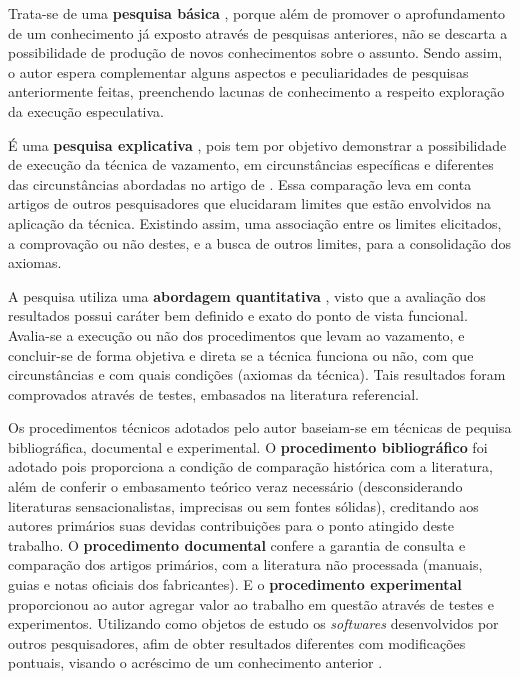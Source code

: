 \documentclass[
	article,			    %
	12pt,				    %
	oneside,			    %
	a4paper,			    %
	chapter=TITLE,		    %
	section=TITLE,		    %
	subsection=TITLE,	    %
	english,			    %
	brazil,				    %
	sumario=tradicional
]{abntex2}
\begin{document}
Trata-se de uma \textbf{pesquisa básica} \cite{Fernando1987Por}, porque além de promover o aprofundamento de um conhecimento já exposto através de pesquisas anteriores, não se descarta a possibilidade de produção de novos conhecimentos sobre o assunto. Sendo assim, o autor espera complementar alguns aspectos e peculiaridades de pesquisas anteriormente feitas, preenchendo lacunas de conhecimento a respeito exploração da execução especulativa.

É uma \textbf{pesquisa explicativa} \cite{Rampazzo2005Metodologia}, pois tem por objetivo demonstrar a possibilidade de execução da técnica de vazamento, em circunstâncias específicas e diferentes das circunstâncias abordadas no artigo de . Essa comparação leva em conta artigos de outros pesquisadores que elucidaram limites que estão envolvidos na aplicação da técnica. Existindo assim, uma associação entre os limites elicitados, a comprovação ou não destes, e a busca de outros limites, para a consolidação dos axiomas.

A pesquisa utiliza uma \textbf{abordagem quantitativa} \cite{Mauro2009Metodologia}, visto que a avaliação dos resultados possui caráter bem definido e exato do ponto de vista funcional. Avalia-se a execução ou não dos procedimentos que levam ao vazamento, e concluir-se de forma objetiva e direta se a técnica funciona ou não, com que circunstâncias e com quais condições (axiomas da técnica). Tais resultados foram comprovados através de testes, embasados na literatura referencial.

Os procedimentos técnicos adotados pelo autor baseiam-se em técnicas de pequisa bibliográfica, documental e experimental. O \textbf{procedimento bibliográfico} foi adotado pois proporciona a condição de comparação histórica com a literatura, além de conferir o embasamento teórico veraz necessário (desconsiderando literaturas sensacionalistas, imprecisas ou sem fontes sólidas), creditando aos autores primários suas devidas contribuições para o ponto atingido deste trabalho. O \textbf{procedimento documental} confere a garantia de consulta e comparação dos artigos primários, com a literatura não processada (manuais, guias e notas oficiais dos fabricantes). E o \textbf{procedimento experimental} proporcionou ao autor agregar valor ao trabalho em questão através de testes e experimentos. Utilizando como objetos de estudo os \emph{softwares} desenvolvidos por outros pesquisadores, afim de obter resultados diferentes com modificações pontuais, visando o acréscimo de um conhecimento anterior \cite{Praca2015Metodologia}.
\end{document}
